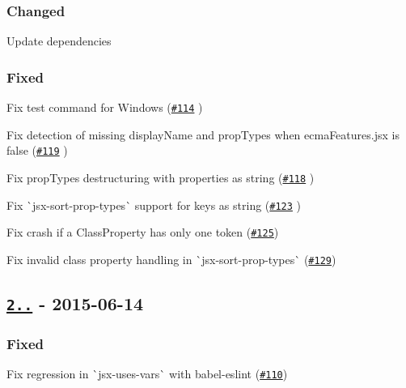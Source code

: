 \subsubsection*{Changed}


\begin{DoxyItemize}
\item Update dependencies
\end{DoxyItemize}

\subsubsection*{Fixed}


\begin{DoxyItemize}
\item Fix test command for Windows (\href{https://github.com/yannickcr/eslint-plugin-react/pull/114}{\tt \#114} )
\item Fix detection of missing display\+Name and prop\+Types when {\ttfamily ecma\+Features.\+jsx} is false (\href{https://github.com/yannickcr/eslint-plugin-react/pull/119}{\tt \#119} )
\item Fix prop\+Types destructuring with properties as string (\href{https://github.com/yannickcr/eslint-plugin-react/issues/118}{\tt \#118} )
\item Fix \`{}jsx-\/sort-\/prop-\/types\`{} support for keys as string (\href{https://github.com/yannickcr/eslint-plugin-react/pull/123}{\tt \#123} )
\item Fix crash if a Class\+Property has only one token (\href{https://github.com/yannickcr/eslint-plugin-react/issues/125}{\tt \#125})
\item Fix invalid class property handling in \`{}jsx-\/sort-\/prop-\/types\`{} (\href{https://github.com/yannickcr/eslint-plugin-react/issues/129}{\tt \#129})
\end{DoxyItemize}

\subsection*{\href{https://github.com/yannickcr/eslint-plugin-react/compare/v2.5.1...v2.5.2}{\tt 2..} -\/ 2015-\/06-\/14}

\subsubsection*{Fixed}


\begin{DoxyItemize}
\item Fix regression in \`{}jsx-\/uses-\/vars\`{} with {\ttfamily babel-\/eslint} (\href{https://github.com/yannickcr/eslint-plugin-react/issues/110}{\tt \#110})
\end{DoxyItemize}

